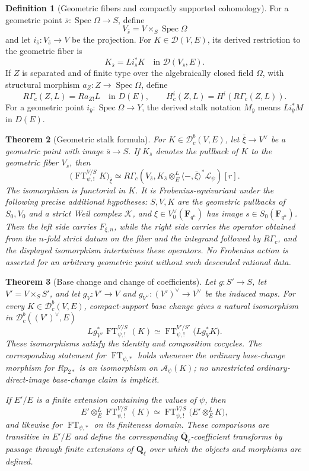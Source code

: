 \documentclass[10pt]{article}
\newtheorem{theorem}{Theorem}[section]
\theoremstyle{definition}
\newtheorem{definition}[theorem]{Definition}
\newcommand{\Ql}{\mathbf Q_\ell}
\newcommand{\Qlb}{\overline{\mathbf Q}_\ell}
\newcommand{\Db}{\mathcal D}
\newcommand{\Dbc}{\mathcal D^b_c}
\newcommand{\FT}{\operatorname{FT}}
\newcommand{\Spec}{\operatorname{Spec}}
\begin{document}
\begin{definition}[Geometric fibers and compactly supported cohomology]
For a geometric point \(\bar s:\Spec\Omega\to S\), define
\[
 V_{\bar s}=V\times_S\Spec\Omega
\]
and let \(i_{\bar s}:V_{\bar s}\to V\) be the projection.  For
\(K\in\Db(V,E)\), its derived restriction to the geometric fiber is
\[
 K_{\bar s}=Li_{\bar s}^*K\quad\text{in }\Db(V_{\bar s},E).
\]
If \(Z\) is separated and of finite type over the algebraically closed
field \(\Omega\), with structural morphism
\(a_Z:Z\to\Spec\Omega\), define
\[
 R\Gamma_c(Z,L)=Ra_{Z!}L\quad\text{in }D(E),
 \qquad
 H_c^i(Z,L)=H^i(R\Gamma_c(Z,L)).
\]
For a geometric point \(i_{\bar y}:\Spec\Omega\to Y\), the derived stalk
notation \(M_{\bar y}\) means \(Li_{\bar y}^*M\) in \(D(E)\).
\end{definition}

\begin{theorem}[Geometric stalk formula]
For \(K\in\Dbc(V,E)\), let \(\bar\xi\to V^\vee\) be a geometric point with
image \(\bar s\to S\).  If \(K_{\bar s}\) denotes the pullback of \(K\) to
the geometric fiber \(V_{\bar s}\), then
\[
 \bigl(\FT^{V/S}_{\psi,!}K\bigr)_{\bar\xi}
 \simeq
 R\Gamma_c\!\left(
 V_{\bar s},
 K_{\bar s}\otimes_E^L
 \langle- ,\bar\xi\rangle^*\mathcal L_\psi
 \right)[r].
\]
The isomorphism is functorial in \(K\).  It is Frobenius-equivariant under
the following precise additional hypotheses: \(S,V,K\) are the geometric
pullbacks of \(S_0,V_0\) and a strict Weil complex \(\mathcal K\), and
\(\xi\in V_0^\vee(\mathbf F_{q^n})\) has image
\(s\in S_0(\mathbf F_{q^n})\).  Then the left side carries
\(F_{\xi,n}\), while the right side carries the operator obtained from the
\(n\)-fold strict datum on the fiber and the integrand followed by
\(R\Gamma_c\), and the displayed isomorphism intertwines these operators.
No Frobenius action is asserted for an arbitrary geometric point without
such descended rational data.
\end{theorem}

\begin{theorem}[Base change and change of coefficients]
Let \(g:S'\to S\), let \(V'=V\times_SS'\), and let
\(g_V:V'\to V\) and \(g_{V^\vee}:(V')^\vee\to V^\vee\) be the induced maps.
For every \(K\in\Dbc(V,E)\), compact-support base change gives a natural
isomorphism in \(\Dbc((V')^\vee,E)\)
\[
 Lg_{V^\vee}^*\FT^{V/S}_{\psi,!}(K)
 \simeq
 \FT^{V'/S'}_{\psi,!}\bigl(Lg_V^*K\bigr).
\]
These isomorphisms satisfy the identity and composition cocycles.  The
corresponding statement for \(\FT_{\psi,*}\) holds whenever the ordinary
base-change morphism for \(Rp_{2*}\) is an isomorphism on
\(\mathcal A_\psi(K)\); no unrestricted ordinary-direct-image base-change
claim is implicit.

If \(E'/E\) is a finite extension containing the values of \(\psi\), then
\[
 E'\otimes_E^L\FT^{V/S}_{\psi,!}(K)
 \simeq
 \FT^{V/S}_{\psi,!}\bigl(E'\otimes_E^LK\bigr),
\]
and likewise for \(\FT_{\psi,*}\) on its finiteness domain.  These
comparisons are transitive in \(E'/E\) and define the corresponding
\(\Qlb\)-coefficient transforms by passage through finite extensions of
\(\Ql\) over which the objects and morphisms are defined.
\end{theorem}
\end{document}
